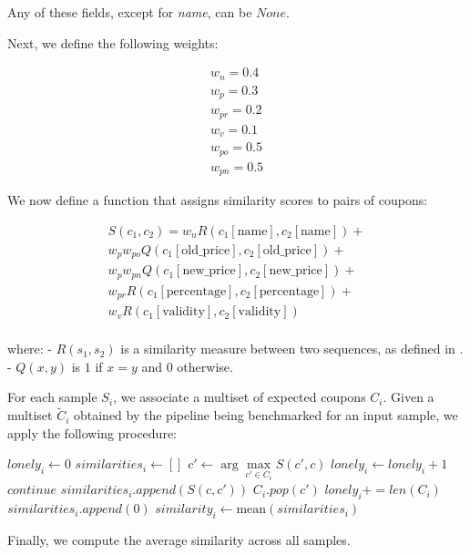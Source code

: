 \documentclass[12pt]{article}
\begin{document}
Any of these fields, except for \textit{name}, can be \( None \).

Next, we define the following weights:

\begin{gather*}
    w_n=0.4 \\
    w_p=0.3 \\
    w_{pr}=0.2 \\
    w_v=0.1 \\
    w_{po}=0.5\\
    w_{pn}=0.5
\end{gather*}

We now define a function that assigns similarity scores to pairs of coupons:

\begin{gather*}
    S(c_1, c_2) = w_n R(c_1[\text{name}], c_2[\text{name}]) +  \\
    w_p w_{po} Q(c_1[\text{old\_price}], c_2[\text{old\_price}]) + \\
    w_p w_{pn} Q(c_1[\text{new\_price}], c_2[\text{new\_price}]) +  \\
    w_{pr} R(c_1[\text{percentage}], c_2[\text{percentage}]) +  \\
    w_v R(c_1[\text{validity}], c_2[\text{validity}])  \\
\end{gather*}

where:
- \( R(s_1, s_2) \) is a similarity measure between two sequences, as defined in \cite{python-seq-match}.
- \( Q(x, y) \) is \( 1 \) if \( x = y \) and \( 0 \) otherwise.

For each sample \( S_i \), we associate a multiset of expected coupons \( C_i \).
Given a multiset \( \tilde{C}_i \) obtained by the pipeline being benchmarked for an input sample, we apply the following procedure:

\begin{algorithmic}
\State $lonely_i \gets 0$
\State $similarities_i \gets []$
    \State $c' \gets \arg\max\limits_{c' \in C_i} S(c',c)$
        \State $lonely_i \gets lonely_i + 1$
        \State $continue$
    \EndIf
    \State $similarities_i.append(S(c,c'))$
    \State $C_i.pop(c')$
\EndFor
\State $lonely_i += len(C_i)$
    \State $similarities_i.append(0)$
\EndFor
\State $similarity_i \gets \text{mean}(similarities_i)$
\end{algorithmic}

Finally, we compute the average similarity across all samples.
\end{document}
